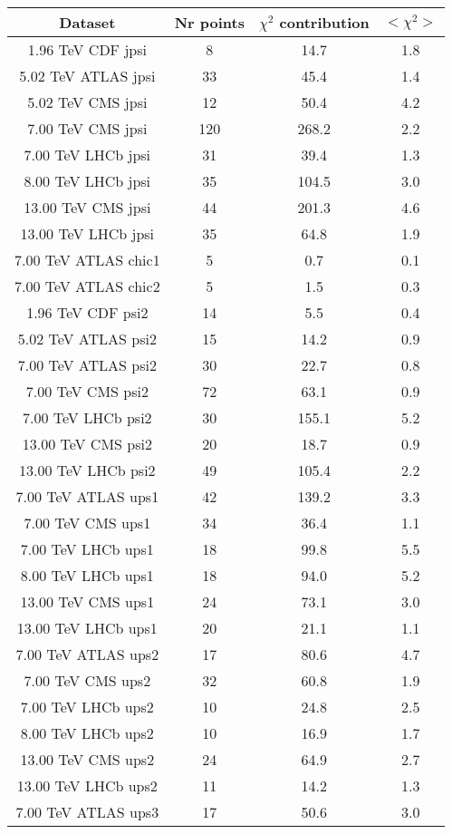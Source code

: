 \begin{table}[h!]
\centering
\begin{tabular}{c|c|c|c}
Dataset & Nr points & $\chi^2$ contribution & $<\chi^2>$ \\
\hline
1.96 TeV CDF jpsi & 8 & 14.7 & 1.8 \\
5.02 TeV ATLAS jpsi & 33 & 45.4 & 1.4 \\
5.02 TeV CMS jpsi & 12 & 50.4 & 4.2 \\
7.00 TeV CMS jpsi & 120 & 268.2 & 2.2 \\
7.00 TeV LHCb jpsi & 31 & 39.4 & 1.3 \\
8.00 TeV LHCb jpsi & 35 & 104.5 & 3.0 \\
13.00 TeV CMS jpsi & 44 & 201.3 & 4.6 \\
13.00 TeV LHCb jpsi & 35 & 64.8 & 1.9 \\
7.00 TeV ATLAS chic1 & 5 & 0.7 & 0.1 \\
7.00 TeV ATLAS chic2 & 5 & 1.5 & 0.3 \\
1.96 TeV CDF psi2 & 14 & 5.5 & 0.4 \\
5.02 TeV ATLAS psi2 & 15 & 14.2 & 0.9 \\
7.00 TeV ATLAS psi2 & 30 & 22.7 & 0.8 \\
7.00 TeV CMS psi2 & 72 & 63.1 & 0.9 \\
7.00 TeV LHCb psi2 & 30 & 155.1 & 5.2 \\
13.00 TeV CMS psi2 & 20 & 18.7 & 0.9 \\
13.00 TeV LHCb psi2 & 49 & 105.4 & 2.2 \\
7.00 TeV ATLAS ups1 & 42 & 139.2 & 3.3 \\
7.00 TeV CMS ups1 & 34 & 36.4 & 1.1 \\
7.00 TeV LHCb ups1 & 18 & 99.8 & 5.5 \\
8.00 TeV LHCb ups1 & 18 & 94.0 & 5.2 \\
13.00 TeV CMS ups1 & 24 & 73.1 & 3.0 \\
13.00 TeV LHCb ups1 & 20 & 21.1 & 1.1 \\
7.00 TeV ATLAS ups2 & 17 & 80.6 & 4.7 \\
7.00 TeV CMS ups2 & 32 & 60.8 & 1.9 \\
7.00 TeV LHCb ups2 & 10 & 24.8 & 2.5 \\
8.00 TeV LHCb ups2 & 10 & 16.9 & 1.7 \\
13.00 TeV CMS ups2 & 24 & 64.9 & 2.7 \\
13.00 TeV LHCb ups2 & 11 & 14.2 & 1.3 \\
7.00 TeV ATLAS ups3 & 17 & 50.6 & 3.0 \\

\end{tabular}
\end{table}
